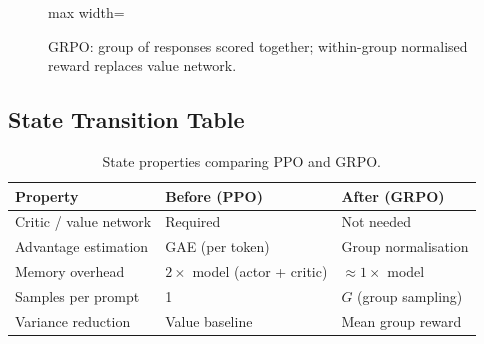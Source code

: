 \begin{figure}[h]
\centering
\begin{adjustbox}{max width=\linewidth}
\end{adjustbox}
\caption{GRPO: group of responses scored together; within-group normalised reward replaces value network.}
\end{figure}

\subsection{State Transition Table}
\begin{table}[h]\centering
\begin{tabular}{lll}\toprule
\textbf{Property} & \textbf{Before (PPO)} & \textbf{After (GRPO)}\\\midrule
Critic / value network & Required & Not needed\\
Advantage estimation & GAE (per token) & Group normalisation\\
Memory overhead & $2\times$ model (actor + critic) & $\approx 1\times$ model\\
Samples per prompt & 1 & $G$ (group sampling)\\
Variance reduction & Value baseline & Mean group reward\\\bottomrule
\end{tabular}
\caption{State properties comparing PPO and GRPO.}
\end{table}

